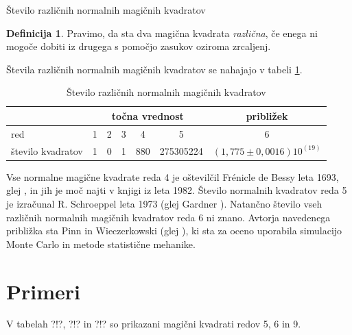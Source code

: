 \documentclass[a4paper,12pt]{article}
\theoremstyle{definition}
\newtheorem{definicija}{Definicija}
\newcommand{\pojem}[1]{\emph{\color{purple}#1}}
\begin{document}
Število različnih normalnih magičnih kvadratov

\begin{definicija}
      Pravimo, da sta dva magična kvadrata \pojem{različna}, če enega ni mogoče dobiti
      iz drugega s pomočjo zasukov oziroma zrcaljenj.
\end{definicija}

Števila različnih normalnih magičnih kvadratov se nahajajo v tabeli \ref{table:stevila}.

\begin{table}
   \centering
   \caption{Število različnih normalnih magičnih kvadratov}
\begin{tabular}{lcccccc}\toprule
      & \multicolumn{5}{c}{točna vrednost} & približek \\\midrule
      red & 1 & 2 & 3 & 4 & 5 & 6 \\
      število kvadratov & 1 & 0 & 1 & 880 & 275305224 & $(1,775 \pm 0,0016)10^(19)$ \\\bottomrule
\end{tabular}
\label{table:stevila}
\end{table}
Vse normalne magične kvadrate reda 4 je oštevilčil Frénicle de Bessy
leta 1693, glej \cite{bessy}, in jih je moč najti v knjigi \cite{berlekamp}
iz leta 1982. Število normalnih kvadratov reda 5 je izračunal
R. Schroeppel leta 1973 (glej Gardner \cite{gardner}).
Natančno število vseh različnih normalnih magičnih kvadratov reda 6 ni znano.
Avtorja navedenega približka sta Pinn in Wieczerkowski (glej \cite{pinn}), ki
sta za oceno uporabila simulacijo Monte Carlo in metode statistične mehanike.


\section{Primeri}

V tabelah ?!?, ?!? in ?!? so prikazani
magični kvadrati redov 5, 6 in 9.
\end{document}

